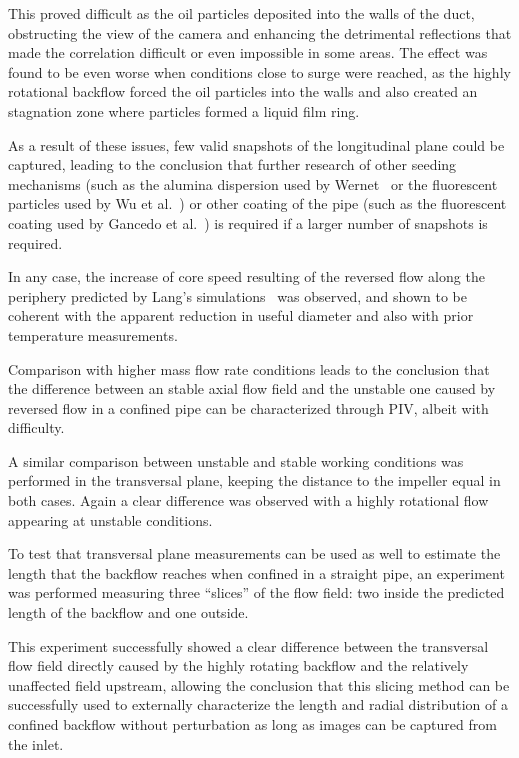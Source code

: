 This proved difficult as the oil particles deposited into the walls of the duct, obstructing the view of the camera and enhancing the detrimental reflections that made the correlation difficult or even impossible in some areas. The effect was found to be even worse when conditions close to surge were reached, as the highly rotational backflow forced the oil particles into the walls and also created an stagnation zone where particles formed a liquid film ring.

As a result of these issues, few valid snapshots of the longitudinal plane could be captured, leading to the conclusion that further research of other seeding mechanisms (such as the alumina dispersion used by Wernet~\cite{wernet2000development} or the fluorescent particles used by Wu et al.~\cite{wu2011piv}) or other coating of the pipe (such as the fluorescent coating used by Gancedo et al.~\cite{gancedo2016piv}) is required if a larger number of snapshots is required.

In any case, the increase of core speed resulting of the reversed flow along the periphery predicted by Lang's simulations~\cite{lang2011contribucion} was observed, and shown to be coherent with the apparent reduction in useful diameter and also with prior temperature measurements.

Comparison with higher mass flow rate conditions leads to the conclusion that the difference between an stable axial flow field and the unstable one caused by reversed flow in a confined pipe can be characterized through PIV, albeit with difficulty.

A similar comparison between unstable and stable working conditions was performed in the transversal plane, keeping the distance to the impeller equal in both cases. Again a clear difference was observed with a highly rotational flow appearing at unstable conditions.

To test that transversal plane measurements can be used as well to estimate the length that the backflow reaches when confined in a straight pipe, an experiment was performed measuring three ``slices'' of the flow field: two inside the predicted length of the backflow and one outside.

This experiment successfully showed a clear difference between the transversal flow field directly caused by the highly rotating backflow and the relatively unaffected field upstream, allowing the conclusion that this slicing method can be successfully used to externally characterize the length and radial distribution of a confined backflow without perturbation as long as images can be captured from the inlet.

